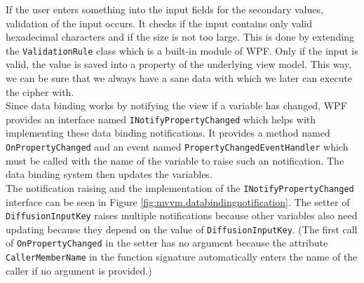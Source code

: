 If the user enters something into the input fields for the secondary values, validation of the input occurs. It checks if the input contains only valid hexadecimal characters and if the size is not too large. This is done by extending the \texttt{ValidationRule} class which is a built-in module of WPF. Only if the input is valid, the value is saved into a property of the underlying view model. This way, we can be sure that we always have a sane data with which we later can execute the cipher with.\\
Since data binding works by notifying the view if a variable has changed, WPF provides an interface named \texttt{INotifyPropertyChanged} which helps with implementing these data binding notifications. It provides a method named \texttt{OnPropertyChanged} and  an event named \texttt{PropertyChangedEventHandler} which must be called with the name of the variable to raise such an notification. The data binding system then updates the variables.\\
The notification raising and the implementation of the \texttt{INotifyPropertyChanged} interface can be seen in Figure \ref{fig:mvvm.databindingnotification}. The setter of \texttt{DiffusionInputKey} raises multiple notifications because other variables also need updating because they depend on the value of \texttt{DiffusionInputKey}. (The first call of \texttt{OnPropertyChanged}  in the setter has no argument because the attribute \texttt{CallerMemberName} in the function signature automatically enters the name of the caller if no argument is provided.)

